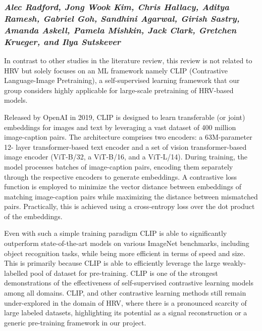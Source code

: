 \documentclass[letterpaper,12pt]{article}
\begin{document}
\subsubsection*{\textbf{\textit{Alec Radford, Jong Wook Kim, Chris Hallacy, Aditya Ramesh, Gabriel Goh, Sandhini Agarwal, Girish Sastry, Amanda Askell, Pamela Mishkin, Jack Clark, Gretchen Krueger, and Ilya Sutskever}}}

In contrast to other studies in the literature review, this review is not
related to HRV but solely focuses on an ML framework namely CLIP (Contrastive
Language-Image Pretraining), a self-supervised learning framework that our
group considers highly applicable for large-scale pretraining of HRV-based
models.

Released by OpenAI in 2019, CLIP is designed to learn transferable (or joint)
embeddings for images and text by leveraging a vast dataset of 400 million
image-caption pairs. The architecture comprises two encoders: a 63M-parameter
12- layer transformer-based text encoder and a set of vision transformer-based
image encoder (ViT-B/32, a ViT-B/16, and a ViT-L/14). During training, the
model processes batches of image-caption pairs, encoding them separately
through the respective encoders to generate embeddings. A contrastive loss
function is employed to minimize the vector distance between embeddings of
matching image-caption pairs while maximizing the distance between mismatched
pairs. Practically, this is achieved using a cross-entropy loss over the dot
product of the embeddings.

Even with such a simple training paradigm CLIP is able to significantly
outperform state-of-the-art models on various ImageNet benchmarks, including
object recognition tasks, while being more efficient in terms of speed and
size. This is primarily because CLIP is able to efficiently leverage the large
weakly-labelled pool of dataset for pre-training. CLIP is one of the strongest
demonstrations of the effectiveness of self-supervised contrastive learning
models among all domains. CLIP, and other contrastive learning methods still
remain under-explored in the domain of HRV, where there is a pronounced
scarcity of large labeled datasets, highlighting its potential as a signal
reconstruction or a generic pre-training framework in our project.
\end{document}
